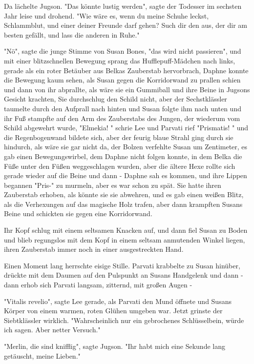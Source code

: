 {Da lächelte Jugson. "Das könnte lustig werden", sagte der Todesser im sechsten Jahr leise und drohend. "Wie wäre es, wenn du meine Schuhe leckst, Schlammblut, und einer deiner Freunde darf gehen? Such dir den aus, der dir am besten gefällt, und lass die anderen in Ruhe."

"Nö", sagte die junge Stimme von Susan Bones, "das wird nicht passieren", und mit einer blitzschnellen Bewegung sprang das Hufflepuff-Mädchen nach links, gerade als ein roter Betäuber aus Belkas Zauberstab hervorbrach, Daphne konnte die Bewegung kaum sehen, als Susan gegen die Korridorwand zu prallen schien und dann von ihr abprallte, als wäre sie ein Gummiball und ihre Beine in Jugsons Gesicht krachten, Sie durchschlug den Schild nicht, aber der Sechstklässler taumelte durch den Aufprall nach hinten und Susan folgte ihm nach unten und ihr Fuß stampfte auf den Arm des Zauberstabs des Jungen, der wiederum vom Schild abgewehrt wurde, "Elmekia! " schrie Lee und Parvati rief "Prismatis! " und die Regenbogenwand bildete sich, aber der feurig blaue Strahl ging durch sie hindurch, als wäre sie gar nicht da, der Bolzen verfehlte Susan um Zentimeter, es gab einen Bewegungswirbel, dem Daphne nicht folgen konnte, in dem Belka die Füße unter den Füßen weggeschlagen wurden, aber die ältere Hexe rollte sich gerade wieder auf die Beine und dann - Daphne sah es kommen, und ihre Lippen begannen "Pris-" zu murmeln, aber es war schon zu spät. Sie hatte ihren Zauberstab erhoben, als könnte sie sie abwehren, und es gab einen weißen Blitz, als die Verhexungen auf das magische Holz trafen, aber dann krampften Susans Beine und schickten sie gegen eine Korridorwand.

Ihr Kopf schlug mit einem seltsamen Knacken auf, und dann fiel Susan zu Boden und blieb regungslos mit dem Kopf in einem seltsam anmutenden Winkel liegen, ihren Zauberstab immer noch in einer ausgestreckten Hand.

Einen Moment lang herrschte eisige Stille. Parvati krabbelte zu Susan hinüber, drückte mit dem Daumen auf den Pulspunkt an Susans Handgelenk und dann - dann erhob sich Parvati langsam, zitternd, mit großen Augen -

"Vitalis revelio", sagte Lee gerade, als Parvati den Mund öffnete und Susans Körper von einem warmen, roten Glühen umgeben war. Jetzt grinste der Siebtklässler wirklich. "Wahrscheinlich nur ein gebrochenes Schlüsselbein, würde ich sagen. Aber netter Versuch."

"Merlin, die sind knifflig", sagte Jugson. "Ihr habt mich eine Sekunde lang getäuscht, meine Lieben."

}
